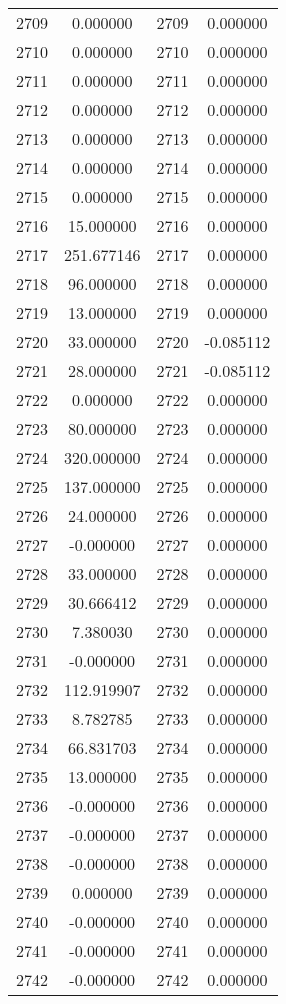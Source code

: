 \documentclass[12pt]{article}
\begin{document}
\begin{longtable}{@{}cccc@{}}
2709 & 0.000000 & 2709 & 0.000000 \\
2710 & 0.000000 & 2710 & 0.000000 \\
2711 & 0.000000 & 2711 & 0.000000 \\
2712 & 0.000000 & 2712 & 0.000000 \\
2713 & 0.000000 & 2713 & 0.000000 \\
2714 & 0.000000 & 2714 & 0.000000 \\
2715 & 0.000000 & 2715 & 0.000000 \\
2716 & 15.000000 & 2716 & 0.000000 \\
2717 & 251.677146 & 2717 & 0.000000 \\
2718 & 96.000000 & 2718 & 0.000000 \\
2719 & 13.000000 & 2719 & 0.000000 \\
2720 & 33.000000 & 2720 & -0.085112 \\
2721 & 28.000000 & 2721 & -0.085112 \\
2722 & 0.000000 & 2722 & 0.000000 \\
2723 & 80.000000 & 2723 & 0.000000 \\
2724 & 320.000000 & 2724 & 0.000000 \\
2725 & 137.000000 & 2725 & 0.000000 \\
2726 & 24.000000 & 2726 & 0.000000 \\
2727 & -0.000000 & 2727 & 0.000000 \\
2728 & 33.000000 & 2728 & 0.000000 \\
2729 & 30.666412 & 2729 & 0.000000 \\
2730 & 7.380030 & 2730 & 0.000000 \\
2731 & -0.000000 & 2731 & 0.000000 \\
2732 & 112.919907 & 2732 & 0.000000 \\
2733 & 8.782785 & 2733 & 0.000000 \\
2734 & 66.831703 & 2734 & 0.000000 \\
2735 & 13.000000 & 2735 & 0.000000 \\
2736 & -0.000000 & 2736 & 0.000000 \\
2737 & -0.000000 & 2737 & 0.000000 \\
2738 & -0.000000 & 2738 & 0.000000 \\
2739 & 0.000000 & 2739 & 0.000000 \\
2740 & -0.000000 & 2740 & 0.000000 \\
2741 & -0.000000 & 2741 & 0.000000 \\
2742 & -0.000000 & 2742 & 0.000000 \\

\end{longtable}
\end{document}
